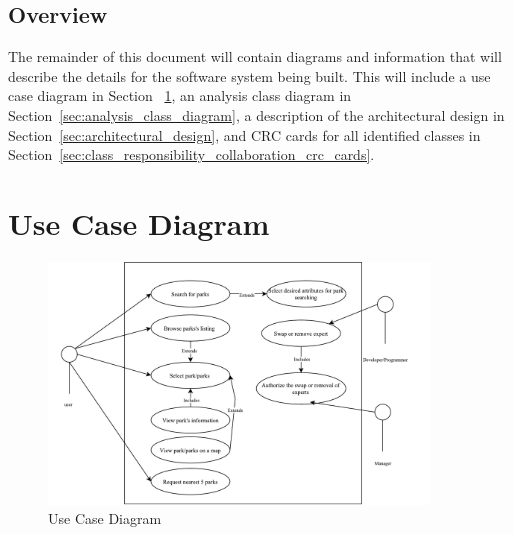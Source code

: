 \documentclass[titlepage,12pt]{article}
\begin{document}

\subsection{Overview}
\label{sub:overview}

The remainder of this document will contain diagrams and information that will describe the details
for the software system being built. This will include a use case diagram in Section~
\ref{sec:use_case_diagram}, an analysis class diagram in Section~\ref{sec:analysis_class_diagram}, a
description of the architectural design in Section~\ref{sec:architectural_design}, and CRC cards for
all identified classes in Section~\ref{sec:class_responsibility_collaboration_crc_cards}.



\section{Use Case Diagram}
\label{sec:use_case_diagram}


\begin{figure}[htbp]
\centerline{\includegraphics[width=0.9\textwidth]{images//UseCase}}
\caption{Use Case Diagram}
\label{useCaseDiagram}
\end{figure}
\end{document}
